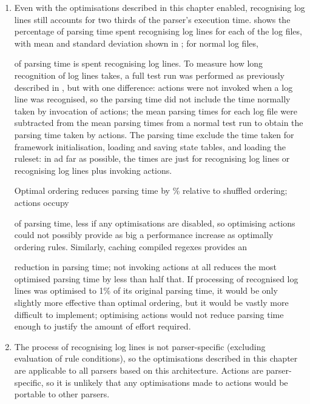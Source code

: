 \begin{enumerate}

    \item Even with the optimisations described in this chapter enabled,
        recognising log lines still accounts for two thirds of the parser's
        execution time.   shows the percentage of parsing time
        spent recognising log lines for each of the \numberOFlogFILES{} log
        files, with mean and standard deviation shown in
        ; for normal log files,
        
        of parsing time is spent recognising log lines.  To measure how
        long recognition of log lines takes, a full test run was performed
        as previously described in , but with
        one difference: actions were not invoked when a log line was
        recognised, so the parsing time did not include the time normally
        taken by invocation of actions; the mean parsing times for each log
        file were subtracted from the mean parsing times from a normal test
        run to obtain the parsing time taken by actions.  The parsing time
        exclude the time taken for framework initialisation, loading and
        saving state tables, and loading the ruleset: in ad far as
        possible, the times are just for recognising log lines or
        recognising log lines plus invoking actions.

        Optimal ordering reduces parsing time by
        \%
        relative to shuffled ordering; actions occupy
        
        of parsing time, less if any optimisations are disabled, so
        optimising actions could not possibly provide as big a performance
        increase as optimally ordering rules.  Similarly, caching compiled
        regexes provides an
        
        reduction in parsing time; not invoking actions at all reduces the
        most optimised parsing time by less than half that.  If processing
        of recognised log lines was optimised to 1\% of its original
        parsing time, it would be only slightly more effective than optimal
        ordering, but it would be vastly more difficult to implement;
        optimising actions would not reduce parsing time enough to justify
        the amount of effort required.

    \item The process of recognising log lines is not parser-specific
        (excluding evaluation of rule conditions), so the optimisations
        described in this chapter are applicable to all parsers based on
        this architecture.  Actions are parser-specific, so it is unlikely
        that any optimisations made to actions would be portable to other
        parsers.

\end{enumerate}

